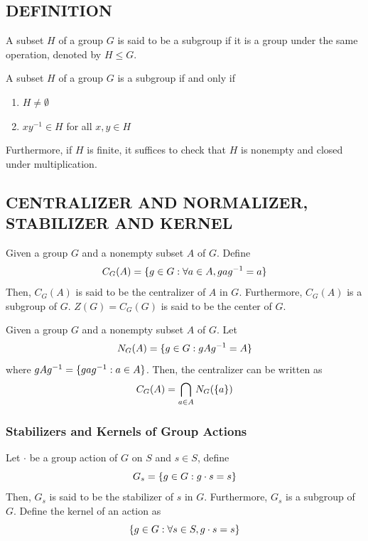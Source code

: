 \subsection{DEFINITION}

\begin{definition}[Subgroup]
	A subset $H$ of a group $G$ is said to be a subgroup if it is a group under the same operation, denoted by $H \leq G$.
\end{definition}

\begin{proposition}
	A subset $H$ of a group $G$ is a subgroup if and only if
	\begin{enumerate}
		\item $H \neq \emptyset$
		\item $xy^{-1} \in H$ for all $x, y \in H$ 
	\end{enumerate}
	Furthermore, if $H$ is finite, it suffices to check that $H$ is nonempty and closed under multiplication.
\end{proposition}


\subsection{CENTRALIZER AND NORMALIZER, STABILIZER AND KERNEL}

\begin{definition}
	Given a group $G$ and a nonempty subset $A$ of $G$. Define 
	\[
	C_G(A) = \{g \in G: \forall a \in A, gag^{-1} = a \}
	\]
	Then, $C_G(A)$ is said to be the centralizer of $A$ in $G$. Furthermore, $C_G(A)$ is a subgroup of $G$.
	$Z(G) = C_G(G)$ is said to be the center of $G$.
\end{definition}

\begin{definition}[Normalizer]
	Given a group $G$ and a nonempty subset $A$ of $G$. Let
	\[
	N_G(A) = \{g \in G: gAg^{-1} = A\}
	\]
	where $gAg^{-1} = \{gag^{-1}: a \in A\}$. Then, the centralizer can be written as
	\[
	C_G(A) = \bigcap_{a \in A} N_G(\{a\})
	\]
\end{definition}

\subsubsection{Stabilizers and Kernels of Group Actions}

\begin{definition}
	Let $\cdot$ be a group action of $G$ on $S$ and $s \in S$, define
	\[
	G_s = \{g \in G: g \cdot s = s\}
	\]
	Then, $G_s$ is said to be the stabilizer of $s$ in $G$. Furthermore, $G_s$ is a subgroup of $G$.
	Define the kernel of an action as 
	\[
	\{g \in G: \forall s \in S, g \cdot s = s\}
	\]
\end{definition}

